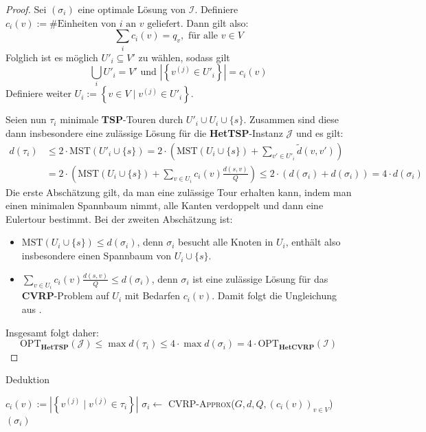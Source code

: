 \documentclass[a4paper,ngerman,12pt,bibtotoc]{scrartcl}
\theoremstyle{definition}
\theoremstyle{plain}
\theoremstyle{remark}
\newcommand{\Ic}{\mathcal{I}}
\newcommand{\Jc}{\mathcal{J}}
\newcommand{\OPT}{\mathrm{OPT}}
\newcommand{\MST}{\mathrm{MST}}
\newcommand{\TSP}{\textbf{TSP}}
\newcommand{\HetTSP}{\textbf{HetTSP}}
\newcommand{\CVRP}{\textbf{CVRP}}
\newcommand{\HetCVRP}{\textbf{HetCVRP}}
\begin{document}
	\begin{proof}
		Sei $(\sigma_i)$ eine optimale Lösung von $\Ic$. Definiere $c_i(v) := \#\text{Einheiten von }i\text{ an }v\text{ geliefert}$. Dann gilt also:
			\[\sum_i c_i(v) = q_v, \text{ für alle } v \in V\]
		Folglich ist es möglich $U'_i \subseteq V'$ zu wählen, sodass gilt
			\[\bigcup_i U'_i = V' \text{ und } \left|\left\lbrace v^{(j)} \in U'_i \right\rbrace\right| = c_i(v)\]
		Definiere weiter $U_i := \left\lbrace v \in V \mid v^{(j)} \in U'_i\right\rbrace$.
		
		Seien nun $\tau_i$ minimale \TSP-Touren durch $U'_i \cup U_i \cup \{s\}$. Zusammen sind diese dann insbesondere eine zulässige Lösung für die \HetTSP-Instanz $\Jc$ und es gilt:
		\begin{align*}
			d(\tau_i) &\leq 2\cdot \MST(U'_i \cup \{s\}) = 2\cdot \left(\MST(U_i \cup \{s\}) + \sum_{v' \in U'_i} \tilde{d}(v,v')\right) \\
					  &= 2\cdot \left(\MST(U_i \cup \{s\}) + \sum_{v \in U_i}c_i(v)\frac{d(s,v)}{Q}\right) \leq 2\cdot \left(d(\sigma_i) + d(\sigma_i)\right) = 4 \cdot d(\sigma_i)
		\end{align*}
		Die erste Abschätzung gilt, da man eine zulässige Tour erhalten kann, indem man einen minimalen Spannbaum nimmt, alle Kanten verdoppelt und dann eine Eulertour bestimmt. Bei der zweiten Abschätzung ist:
		\begin{itemize}
			\item $\MST(U_i \cup \{s\}) \leq d(\sigma_i)$, denn $\sigma_i$ besucht alle Knoten in $U_i$, enthält also insbesondere einen Spannbaum von $U_i \cup \{s\}$.
			\item $\sum_{v \in U_i}c_i(v)\frac{d(s,v)}{Q} \leq d(\sigma_i)$, denn $\sigma_i$ ist eine zulässige Lösung für das \CVRP-Problem auf $U_i$ mit Bedarfen $c_i(v)$. Damit folgt die Ungleichung aus .
		\end{itemize}
		
		Insgesamt folgt daher:
			\[\OPT_\HetTSP(\Jc) \leq \max d(\tau_i) \leq 4\cdot \max d(\sigma_i) = 4\cdot \OPT_\HetCVRP(\Ic)\]
	\end{proof}

	\begin{algorithm}[H]
		\caption{Deduktion}\label{AlgDeduktion}
		\begin{algorithmic}[1]
			\Procedure{Deduktion}{$\Ic, \Jc, (\tau_i)$}
				\State $c_i(v) := \left|\left\lbrace v^{(j)} \mid v^{(j)} \in \tau_i \right\rbrace\right|$
				\State $\sigma_i \gets $ \textsc{CVRP-Approx}($G, d, Q, \left(c_i(v)\right)_{v\in V}$)
			\EndFor
			\State \Return $\left(\sigma_i\right)$
			\EndProcedure
		\end{algorithmic}
	\end{algorithm}	
	
\end{document}
